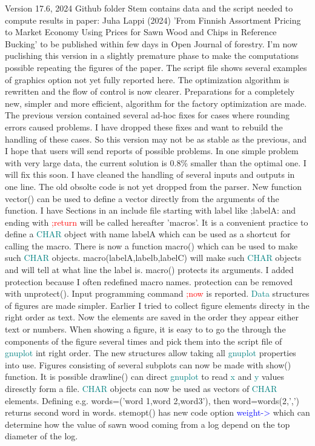 Version 17.6, 2024 Github folder Stem contains data and the script needed to compute results in paper: Juha Lappi (2024) 'From Finnish Assortment Pricing to Market 
Economy Using Prices for Sawn Wood and 
Chips in Reference Bucking' to be  published within few days in Open Journal of forestry. 
I'm now puclishing this version in a slightly premature phase to make the computations possible repeating the figures 
of the paper. 
The script file shows several 
examples of graphics option not yet fully reported here. The optimization algorithm is 
rewritten and the flow of control is now clearer. Preparations for a completely new, simpler and more efficient, algorithm for the factory optimization are made. 
The previous version contained several ad-hoc fixes for cases where rounding errors caused problems. 
I have dropped these fixes and want to rebuild the handling of these cases. So this version may not be 
as stable as the previous, and I hope that users will send reports of possible problems. In one simple problem with 
very large data, the current solution is 0.8\% smaller than the optimal one. I will fix this soon. 
I have cleaned the handling of several inputs and outputs in one line. The old obsolte code is not yet dropped 
from the parser. New function \textcolor{VioletRed}{vector}() can be used to define a vector directly from the arguments of the function. 
I have  Sections in an include file starting with label like ;labelA: and 
ending with \textcolor{Red}{;return} will be called hereafter 'macros'. It is a convenient practice to 
define a \textcolor{teal}{CHAR} object with name labelA which can be used as a shortcut for calling the macro. 
There is now a function \textcolor{VioletRed}{macro}() which can be used to make such \textcolor{teal}{CHAR} objects. 
\textcolor{VioletRed}{macro}(labelA,labelb,labelC) will make such \textcolor{teal}{CHAR} objects and will tell at what line the label is. 
\textcolor{VioletRed}{macro}() protects its arguments. I added protection because I often redefined macro names. 
protection can be removed with \textcolor{VioletRed}{unprotect}(). 
Input programming command \textcolor{Red}{;now} is reported. \textcolor{teal}{Data} structures of figures are made simpler. 
Earlier I tried to collect figure elements directy in the right order as text. Now 
the elements are saved in the order they appear either text or numbers. 
When showing a figure, it is easy to 
to go the through the components of the figure several times and pick them into the script file of \textcolor{teal}{gnuplot} 
int right order. 
The new structures allow taking all \textcolor{teal}{gnuplot} properties into use. Figures consisting of several 
subplots can now be made with \textcolor{VioletRed}{show}() function. It is possible \textcolor{VioletRed}{drawline}() can direct \textcolor{teal}{gnuplot} to read \textcolor{teal}{x} and \textcolor{teal}{y} values diresctly form a file. 
\textcolor{teal}{CHAR} objects can now be used as vectors of \textcolor{teal}{CHAR} elements. Defining e.g. words=('word 1,word 2,word3'), then word=words(2,',') 
returns second word in words. 
\textcolor{VioletRed}{stemopt}() has new code option \textcolor{blue}{weight->} which can determine how the value of sawn wood coming from a log 
depend on the top diameter of the log. 
 
